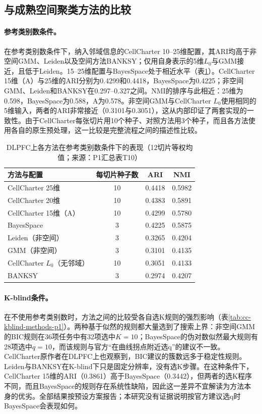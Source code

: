 \subsection{与成熟空间聚类方法的比较}
\label{subsec:cc-res-baselines-p1}

\paragraph{参考类别数条件。}在参考类别数条件下，纳入邻域信息的CellCharter 10--25维配置，其ARI均高于非空间GMM、Leiden以及空间方法BANKSY；仅用自身表示的5维$L_0$与GMM接近，且低于Leiden。15--25维配置与BayesSpace处于相近水平（表\ref{tab:cc-oracle-methods-p1}）。CellCharter 15维（A）与25维的ARI分别为0.4299和0.4418，BayesSpace为0.4225；非空间GMM、Leiden和BANKSY在0.297--0.327之间。NMI的排序与此相近：25维为0.598，BayesSpace为0.588，A为0.578。非空间GMM与CellCharter $L_0$使用相同的5维输入，两者的ARI非常接近（0.3101与0.3051），这从内部印证了两套实现的一致性。由于CellCharter每张切片用10个种子、对照方法用3个种子，而且各方法使用各自的原生预处理，这一比较是完整流程之间的描述性比较。

\begin{table}[htbp]
\centering
\caption{DLPFC上各方法在参考类别数条件下的表现（12切片等权均值；来源：P1汇总表T10）}
\label{tab:cc-oracle-methods-p1}
\small
\begin{tabular}{lccc}
\toprule
方法与配置 & 每切片种子数 & ARI & NMI\\
\midrule
CellCharter 25维 & 10 & 0.4418 & 0.5982\\
CellCharter 20维 & 10 & 0.4383 & 0.5891\\
CellCharter 15维（A） & 10 & 0.4299 & 0.5780\\
BayesSpace & 3 & 0.4225 & 0.5875\\
Leiden（非空间） & 3 & 0.3265 & 0.4204\\
GMM（非空间） & 3 & 0.3101 & 0.4135\\
CellCharter $L_0$（无邻域） & 10 & 0.3051 & 0.4133\\
BANKSY & 3 & 0.2974 & 0.4207\\
\bottomrule
\end{tabular}
\end{table}

\paragraph{K-blind条件。}在不使用参考类别数时，方法之间的比较受各自选K规则的强烈影响（表\ref{tab:cc-kblind-methods-p1}）。两种基于似然的规则都大量选到了搜索上界：非空间GMM的BIC规则在36项任务中有32项选中$K=10$；BayesSpace的伪对数似然最大规则有28项选中$q=10$，而该规则与官方“在曲线拐点附近选q”的建议不一致\cite{bayesspacevignette}。CellCharter原作者在DLPFC上也观察到，BIC建议的簇数远多于稳定性规则\cite{varrone2024}。Leiden与BANKSY在K-blind下只是固定分辨率，没有选K步骤。在这种条件下，CellCharter 15维的ARI（0.3861）高于BayesSpace（0.3442），但两者的选K程序不同，而且BayesSpace的规则存在系统性缺陷，因此这一差异不宜解读为方法本身的优劣。全部结果按预设方案报告；本研究没有证据说明按官方建议选q时BayesSpace会表现如何。

